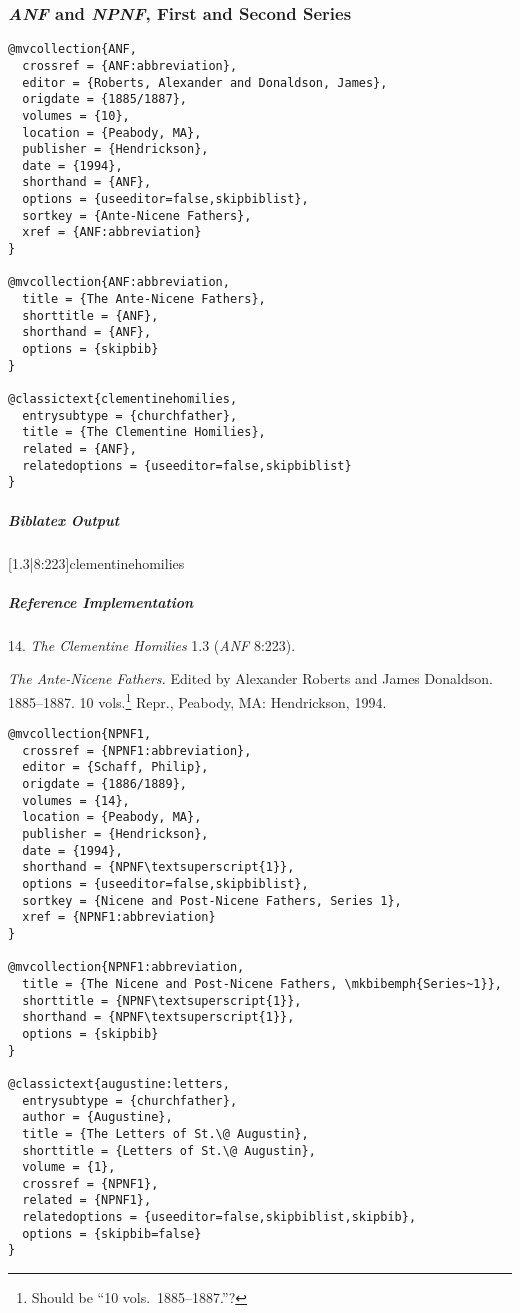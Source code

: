 \documentclass[a4paper]{article}
\newenvironment{biboutput}{%
  \subparagraph{Biblatex Output}
}{\color{black}}
\newenvironment{refimp}{%
  \subparagraph{Reference Implementation}
  \color{reference-colour}
  \rm
}{\par\color{black}}
\begin{document}
\subsubsection{\emph{ANF} and \emph{NPNF}, First and Second Series}

\begin{lstlisting}
@mvcollection{ANF,
  crossref = {ANF:abbreviation},
  editor = {Roberts, Alexander and Donaldson, James},
  origdate = {1885/1887},
  volumes = {10},
  location = {Peabody, MA},
  publisher = {Hendrickson},
  date = {1994},
  shorthand = {ANF},
  options = {useeditor=false,skipbiblist},
  sortkey = {Ante-Nicene Fathers},
  xref = {ANF:abbreviation}
}

@mvcollection{ANF:abbreviation,
  title = {The Ante-Nicene Fathers},
  shorttitle = {ANF},
  shorthand = {ANF},
  options = {skipbib}
}

@classictext{clementinehomilies,
  entrysubtype = {churchfather},
  title = {The Clementine Homilies},
  related = {ANF},
  relatedoptions = {useeditor=false,skipbiblist}
}
\end{lstlisting}

\begin{biboutput}
  [1.3|8:223]{clementinehomilies}
\end{biboutput}

\begin{refimp}
  \hspace*{\bibindent}14. \emph{The Clementine Homilies} 1.3 (\emph{ANF}
  8:223).

  \hangindent\bibindent \emph{The Ante-Nicene Fathers.} Edited by Alexander
  Roberts and James Donaldson. 1885–1887. 10 vols.\footnote{Should be “10
  vols.\ 1885–1887.”?} Repr., Peabody, MA:
  Hendrickson, 1994.

\end{refimp}

\medskip

\begin{lstlisting}
@mvcollection{NPNF1,
  crossref = {NPNF1:abbreviation},
  editor = {Schaff, Philip},
  origdate = {1886/1889},
  volumes = {14},
  location = {Peabody, MA},
  publisher = {Hendrickson},
  date = {1994},
  shorthand = {NPNF\textsuperscript{1}},
  options = {useeditor=false,skipbiblist},
  sortkey = {Nicene and Post-Nicene Fathers, Series 1},
  xref = {NPNF1:abbreviation}
}

@mvcollection{NPNF1:abbreviation,
  title = {The Nicene and Post-Nicene Fathers, \mkbibemph{Series~1}},
  shorttitle = {NPNF\textsuperscript{1}},
  shorthand = {NPNF\textsuperscript{1}},
  options = {skipbib}
}

@classictext{augustine:letters,
  entrysubtype = {churchfather},
  author = {Augustine},
  title = {The Letters of St.\@ Augustin},
  shorttitle = {Letters of St.\@ Augustin},
  volume = {1},
  crossref = {NPNF1},
  related = {NPNF1},
  relatedoptions = {useeditor=false,skipbiblist,skipbib},
  options = {skipbib=false}
}
\end{lstlisting}
\end{document}

